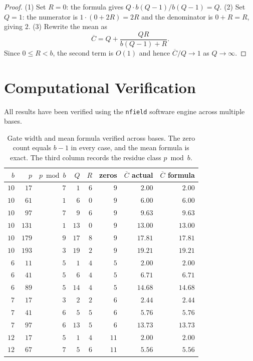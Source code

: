\documentclass[12pt]{amsart}
\theoremstyle{definition}
\theoremstyle{remark}
\begin{document}
\begin{proof}
(1) Set $R = 0$: the formula gives $Q \cdot b(Q{-}1) / b(Q{-}1)
= Q$.
(2) Set $Q = 1$: the numerator is $1 \cdot (0 + 2R) = 2R$ and
the denominator is $0 + R = R$, giving $2$.
(3) Rewrite the mean as
\[
\overline{C}
= Q + \frac{QR}{b(Q{-}1)+R}.
\]
Since $0 \le R < b$, the second term is $O(1)$ and hence
$\overline{C}/Q \to 1$ as $Q \to \infty$.
\end{proof}

\section{Computational Verification}

All results have been verified using the \texttt{nfield} software
engine across multiple bases.

\begin{table}[h]
\centering
\begin{tabular}{rrrrrrrr}
\toprule
$b$ & $p$ & $p\bmod b$ & $Q$ & $R$ & zeros & $\overline{C}$ actual
& $\overline{C}$ formula \\
\midrule
$10$ & $17$ & $7$ & $1$ & $6$ & $9$ & $2.00$ & $2.00$ \\
$10$ & $61$ & $1$ & $6$ & $0$ & $9$ & $6.00$ & $6.00$ \\
$10$ & $97$ & $7$ & $9$ & $6$ & $9$ & $9.63$ & $9.63$ \\
$10$ & $131$ & $1$ & $13$ & $0$ & $9$ & $13.00$ & $13.00$ \\
$10$ & $179$ & $9$ & $17$ & $8$ & $9$ & $17.81$ & $17.81$ \\
$10$ & $193$ & $3$ & $19$ & $2$ & $9$ & $19.21$ & $19.21$ \\
$6$ & $11$ & $5$ & $1$ & $4$ & $5$ & $2.00$ & $2.00$ \\
$6$ & $41$ & $5$ & $6$ & $4$ & $5$ & $6.71$ & $6.71$ \\
$6$ & $89$ & $5$ & $14$ & $4$ & $5$ & $14.68$ & $14.68$ \\
$7$ & $17$ & $3$ & $2$ & $2$ & $6$ & $2.44$ & $2.44$ \\
$7$ & $41$ & $6$ & $5$ & $5$ & $6$ & $5.76$ & $5.76$ \\
$7$ & $97$ & $6$ & $13$ & $5$ & $6$ & $13.73$ & $13.73$ \\
$12$ & $17$ & $5$ & $1$ & $4$ & $11$ & $2.00$ & $2.00$ \\
$12$ & $67$ & $7$ & $5$ & $6$ & $11$ & $5.56$ & $5.56$ \\
\bottomrule
\end{tabular}
\caption{Gate width and mean formula verified across bases. The
zero count equals $b - 1$ in every case, and the mean formula is
exact. The third column records the residue class $p \bmod b$.}
\label{tab:verification}
\end{table}
\end{document}
